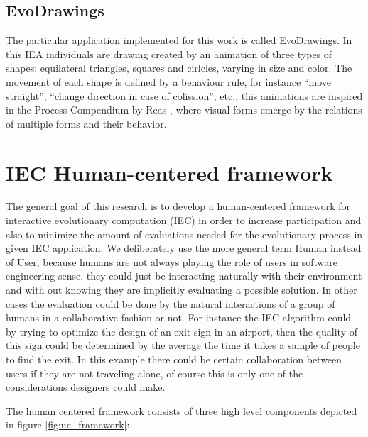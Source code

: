 \documentclass[conference]{IEEEtran}
\begin{document}
\subsection{EvoDrawings}
\label{sec:evo_drawings}
The particular application implemented for this work is called
EvoDrawings. In this IEA individuals are drawing created by an animation of three types of 
shapes: equilateral triangles, squares and cirlcles, varying in size and color. The movement of
each shape is defined by a behaviour rule, for instance  ``move straight'', 
``change direction in case of colission'',  etc., this animations are inspired in 
the Process Compendium by Reas \cite{reas2004}, where visual forms 
emerge by the relations of multiple forms and their behavior. 


 \section{IEC Human-centered framework}
\label{sec:graph}
The general goal of this research is to develop a human-centered \cite{gasson2003human} framework
for interactive evolutionary computation (IEC) in order to increase
participation and also to minimize the amount of evaluations needed for the
evolutionary process in given IEC application. We deliberately use the 
more general
term Human instead of User, because humans are not always playing the role of
users in software engineering sense, they could just be interacting 
naturally with their environment and with out knowing they are implicitly
evaluating a possible solution. In other cases the evaluation could be done
by the natural interactions of a group of humans in a collaborative fashion
or not. For instance the IEC algorithm could by trying to optimize 
the design of an exit sign in an airport, then the quality of this sign could be
determined by the average the time it takes a sample of people to 
find the exit. In this example there could be certain collaboration
between users if they are not traveling alone, of course this is only one of
the considerations designers could make. 


The human centered framework consists of three high level components depicted
in figure \ref{fig:uc_framework}:
\end{document}
